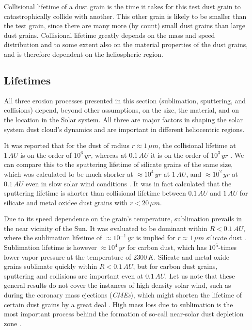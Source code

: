Collisional lifetime of a dust grain is the time it takes for this test dust grain to catastrophically collide with another. This other grain is likely to be smaller than the test grain, since there are many more (by count) small dust grains than large dust grains. Collisional lifetime greatly depends on the mass and speed distribution and to some extent also on the material properties of the dust grains, and is therefore dependent on the heliospheric region. 

\subsection{Lifetimes}

All three erosion processes presented in this section (sublimation, sputtering, and collisions) depend, beyond other assumptions, on the size, the material, and on the location in the Solar system. All three are major factors in shaping the solar system dust cloud's dynamics and are important in different heliocentric regions. 

It was reported that for the dust of radius $r \approx 1 \, \si{\mu m}$, the collisional lifetime at $1\,\si{AU}$ is on the order of $10^6 \, \si{yr}$, whereas at $0.1\,\si{AU}$ it is on the order of $10^3 \, \si{yr}$ \citep{grun1985collisional}. We can compare this to the sputtering lifetime of silicate grains of the same size, which was calculated to be much shorter at  $\approx 10^4 \, \si{yr}$ at $1\,\si{AU}$, and $\approx 10^2 \, \si{yr}$ at $0.1\,\si{AU}$ even in slow solar wind conditions \citep{klepper2021influence}. It was in fact calculated \citep{klepper2021influence} that the sputtering lifetime is shorter than collisional lifetime between $0.1 \, \si{AU}$ and $1 \, \si{AU}$ for silicate and metal oxidee dust grains with $r<20 \, \si{\mu m}$.

Due to its speed dependence on the grain's temperature, sublimation prevails in the near vicinity of the Sun. It was evaluated to be dominant within $R < 0.1 \, \si{AU}$, where the sublimation lifetime of $\approx 10^{-1} \, \si{yr}$ is implied for $r \approx 1 \, \si{\mu m}$ silicate dust \cite{baumann2020dust}. Sublimation lifetime is however $\approx 10^{4} \, \si{yr}$ for carbon dust, which has $10^5$-times lower vapor pressure at the temperature of $2300\, \si{K}$. Silicate and metal oxide grains sublimate quickly within $R<0.1\, \si{AU}$, but for carbon dust grains, sputtering and collisions are important even at $0.1 \, \si{AU}$. Let us note that these general results do not cover the instances of high density solar wind, such as during the coronary mass ejections (\textit{CMEs}), which might shorten the lifetime of certain dust grains by a great deal \citep{baumann2020dust}. High mass loss due to sublimation is the most important process behind the formation of so-call near-solar dust depletion zone \citep{russell1929meteoric}. 

